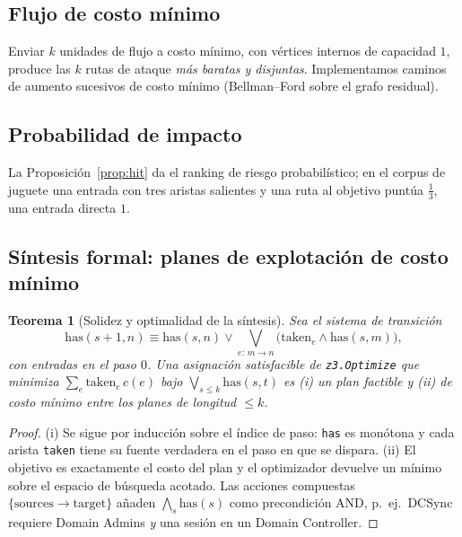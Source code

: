 \documentclass[journal]{IEEEtran}
\newtheorem{theorem}{Teorema}
\begin{document}
\subsection{Flujo de costo mínimo}
Enviar $k$ unidades de flujo a costo mínimo, con vértices internos de capacidad
$1$, produce las $k$ rutas de ataque \emph{más baratas y disjuntas}. Implementamos
caminos de aumento sucesivos de costo mínimo (Bellman--Ford sobre el grafo
residual).

\subsection{Probabilidad de impacto}
La Proposición~\ref{prop:hit} da el ranking de riesgo probabilístico; en el corpus
de juguete una entrada con tres aristas salientes y una ruta al objetivo puntúa
$\tfrac13$, una entrada directa $1$.

\subsection{Síntesis formal: planes de explotación de costo mínimo}
\begin{theorem}[Solidez y optimalidad de la síntesis]
\label{thm:synth}
Sea el sistema de transición
\[
\mathrm{has}(s{+}1,n)\equiv \mathrm{has}(s,n)
\vee \bigvee_{e:\,m\to n}\bigl(\mathrm{taken}_e\wedge\mathrm{has}(s,m)\bigr),
\]
con entradas en el paso $0$. Una asignación satisfacible de
\texttt{z3.Optimize} \cite{z3} que minimiza $\sum_e \mathrm{taken}_e\,c(e)$ bajo
$\bigvee_{s\le k}\mathrm{has}(s,t)$ es (i) un plan factible y (ii) de costo mínimo
entre los planes de longitud $\le k$.
\end{theorem}
\begin{proof}
(i) Se sigue por inducción sobre el índice de paso: \texttt{has} es monótona y cada
arista \texttt{taken} tiene su fuente verdadera en el paso en que se dispara. (ii)
El objetivo es exactamente el costo del plan y el optimizador devuelve un mínimo
sobre el espacio de búsqueda acotado. Las acciones compuestas
$\{\mathrm{sources}\to \mathrm{target}\}$ añaden $\bigwedge_{s}\mathrm{has}(s)$
como precondición AND, p.\ ej.\ DCSync requiere Domain Admins \emph{y} una sesión
en un Domain Controller. \qedhere
\end{proof}
\end{document}
